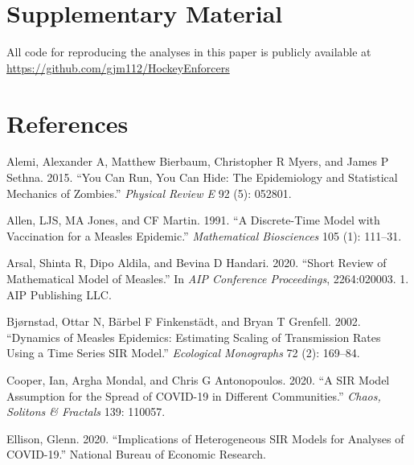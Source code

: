 \documentclass[
  12pt,
]{article}
\newlength{\cslhangindent}
\newlength{\cslentryspacingunit} %
\newenvironment{CSLReferences}[2] %
 {%
  \setlength{\parindent}{0pt}
  \ifodd #1
  \let\oldpar\par
  \def\par{\hangindent=\cslhangindent\oldpar}
  \fi
  \setlength{\parskip}{#2\cslentryspacingunit}
 }%
 {}
\begin{document}
\hypertarget{supplementary-material}{%
\section*{Supplementary Material}\label{supplementary-material}}

All code for reproducing the analyses in this paper is publicly
available at \url{https://github.com/gjm112/HockeyEnforcers}

\hypertarget{references}{%
\section*{References}\label{references}}

\hypertarget{refs}{}
\begin{CSLReferences}{1}{0}
\leavevmode{}%
Alemi, Alexander A, Matthew Bierbaum, Christopher R Myers, and James P
Sethna. 2015. {``You Can Run, You Can Hide: The Epidemiology and
Statistical Mechanics of Zombies.''} \emph{Physical Review E} 92 (5):
052801.

\leavevmode{}%
Allen, LJS, MA Jones, and CF Martin. 1991. {``A Discrete-Time Model with
Vaccination for a Measles Epidemic.''} \emph{Mathematical Biosciences}
105 (1): 111--31.

\leavevmode{}%
Arsal, Shinta R, Dipo Aldila, and Bevina D Handari. 2020. {``Short
Review of Mathematical Model of Measles.''} In \emph{AIP Conference
Proceedings}, 2264:020003. 1. AIP Publishing LLC.

\leavevmode{}%
Bjørnstad, Ottar N, Bärbel F Finkenstädt, and Bryan T Grenfell. 2002.
{``Dynamics of Measles Epidemics: Estimating Scaling of Transmission
Rates Using a Time Series SIR Model.''} \emph{Ecological Monographs} 72
(2): 169--84.

\leavevmode{}%
Cooper, Ian, Argha Mondal, and Chris G Antonopoulos. 2020. {``A SIR
Model Assumption for the Spread of COVID-19 in Different Communities.''}
\emph{Chaos, Solitons \& Fractals} 139: 110057.

\leavevmode{}%
Ellison, Glenn. 2020. {``Implications of Heterogeneous SIR Models for
Analyses of COVID-19.''} National Bureau of Economic Research.


\end{CSLReferences}
\end{document}
